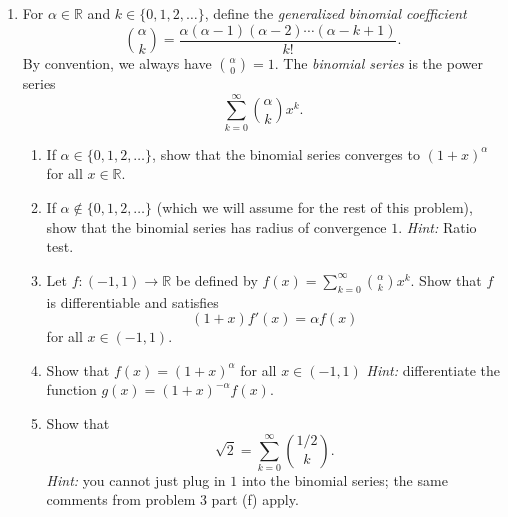\documentclass[12pt, letterpaper]{article}
\newcommand{\0}{\mathbf{0}}
\newcommand{\1}{\mathbf{1}}
\begin{document}
\begin{enumerate}
\begin{enumerate}
    \end{enumerate}
    
    \vspace{0.5cm}

    \item 
    For $\alpha \in \mathbb{R}$ and $k \in \{0, 1, 2, \dots\}$, define the \textit{generalized binomial coefficient}
    \begin{equation*}
        \binom{\alpha}{k} = \frac{\alpha(\alpha - 1)(\alpha - 2) \cdots (\alpha - k + 1)}{k!}.
    \end{equation*}
    By convention, we always have $\binom{\alpha}{0} = 1$. The \textit{binomial series} is the power series
    \begin{equation*}
        \sum_{k = 0}^{\infty} \binom{\alpha}{k} x^k.
    \end{equation*}
    \begin{enumerate}
        \item 
        If $\alpha \in \{0, 1, 2, \dots\}$, show that the binomial series converges to $(1 + x)^\alpha$ for all $x \in \mathbb{R}$.\\

        \item 
        If $\alpha \notin \{0, 1, 2, \dots\}$ (which we will assume for the rest of this problem), show that the binomial series has radius of convergence $1$. \textit{Hint:} Ratio test.\\

        \item 
        Let $f : (-1, 1) \to \mathbb{R}$ be defined by $f(x) = \sum_{k = 0}^{\infty} \binom{\alpha}{k} x^k$. Show that $f$ is differentiable and satisfies
        \begin{equation*}
            (1 + x)f'(x)  = \alpha f(x)
        \end{equation*}
        for all $x \in (-1, 1)$.\\
        
        \item 
        Show that $f(x) = (1 + x)^\alpha$ for all $x \in (-1, 1)$ \textit{Hint:} differentiate the function $g(x) = (1 + x)^{-\alpha}f(x)$.\\

        \item 
        Show that 
        \begin{equation*}
            \sqrt{2} = \sum_{k = 0}^{\infty} \binom{1/2}{k}.
        \end{equation*}
        \textit{Hint:}  you cannot just plug in $1$ into the binomial series; the same comments from problem 3 part (f) apply.
        

        
    \end{enumerate}
    

      
    
    
    
    
\end{enumerate}
\end{document}
